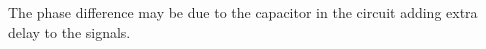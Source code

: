\documentclass[a4paper, 12pt]{article}
\begin{document}
\begin{figure}[!h]
	\centering
	\hfill
	\caption{}
	\label{fig:phase}
\end{figure}

The phase difference may be due to the capacitor in the circuit adding extra delay to the signals.
\end{document}

